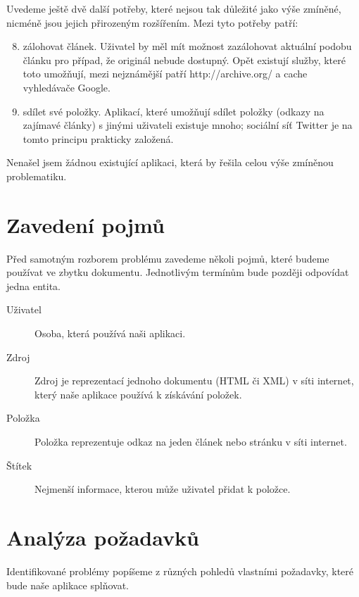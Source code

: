 Uvedeme ještě dvě další potřeby, které nejsou tak důležité jako výše zmíněné, nicméně jsou jejich přirozeným rozšířením.
Mezi tyto potřeby patří:

\begin{enumerate}
	\setcounter{enumi}{7}
	\item zálohovat článek.
		Uživatel by měl mít možnost zazálohovat aktuální podobu článku pro případ, že originál nebude dostupný.
		Opět existují služby, které toto umožňují, mezi nejznámější patří http://archive.org/ a cache vyhledávače Google.
	\item sdílet své položky.
		Aplikací, které umožňují sdílet položky (odkazy na zajímavé články) s jinými uživateli existuje mnoho; sociální síť Twitter je na tomto principu prakticky založená.
\end{enumerate}

\begin{leftbar}
	Nenašel jsem žádnou existující aplikaci, která by řešila celou výše zmíněnou problematiku.
\end{leftbar}

\section{Zavedení pojmů}

Před samotným rozborem problému zavedeme několi pojmů, které budeme používat ve zbytku dokumentu.
Jednotlivým termínům bude později odpovídat jedna entita.

\begin{description}
    \item[Uživatel] Osoba, která používá naši aplikaci.
    \item[Zdroj] Zdroj je reprezentací jednoho dokumentu (HTML či XML) v síti internet, který naše aplikace používá k získávání položek.
    \item[Položka] Položka reprezentuje odkaz na jeden článek nebo stránku v síti internet.
    \item[Štítek] Nejmenší informace, kterou může uživatel přidat k položce.
\end{description}

\section{Analýza požadavků}

Identifikované problémy popíšeme z různých pohledů vlastními požadavky, které bude naše aplikace splňovat.

